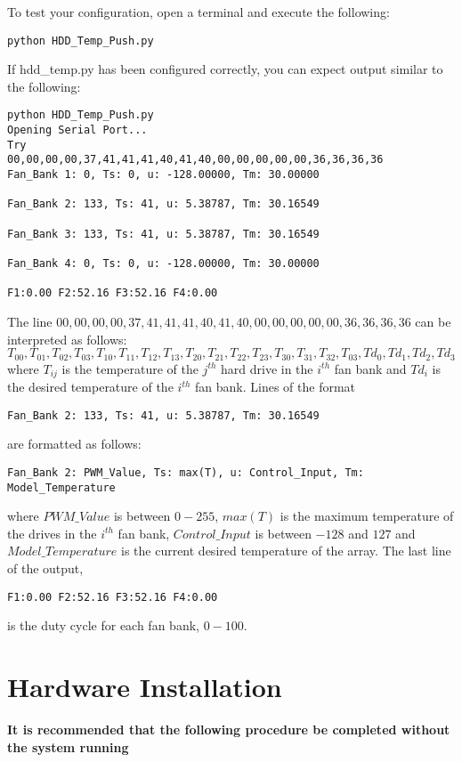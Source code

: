 \documentclass[10pt,letterpaper]{report}
\begin{document}
To test your configuration, open a terminal and execute the following:
%
\begin{verbatim}
python HDD_Temp_Push.py
\end{verbatim}
%
If hdd\_temp.py has been configured correctly, you can expect output similar to the following:
%
\begin{verbatim}
python HDD_Temp_Push.py
Opening Serial Port...
Try
00,00,00,00,37,41,41,41,40,41,40,00,00,00,00,00,36,36,36,36
Fan_Bank 1: 0, Ts: 0, u: -128.00000, Tm: 30.00000

Fan_Bank 2: 133, Ts: 41, u: 5.38787, Tm: 30.16549

Fan_Bank 3: 133, Ts: 41, u: 5.38787, Tm: 30.16549

Fan_Bank 4: 0, Ts: 0, u: -128.00000, Tm: 30.00000

F1:0.00 F2:52.16 F3:52.16 F4:0.00
\end{verbatim}
The line $00,00,00,00,37,41,41,41,40,41,40,00,00,00,00,00,36,36,36,36$ can be interpreted as follows:
%
\begin{equation}
 T_{00},T_{01},T_{02},T_{03},T_{10},T_{11},T_{12},T_{13},T_{20},T_{21},T_{22},T_{23},T_{30},T_{31},T_{32},T_{03},Td_0,Td_1,Td_2,Td_3
\end{equation}
%
where $T_{ij}$ is the temperature of the $j^{th}$ hard drive in the $i^{th}$ fan bank and $Td_i$ is the desired temperature of the $i^{th}$ fan bank. Lines of the format 
\begin{verbatim}
Fan_Bank 2: 133, Ts: 41, u: 5.38787, Tm: 30.16549
\end{verbatim}
are formatted as follows:
\begin{verbatim}
Fan_Bank 2: PWM_Value, Ts: max(T), u: Control_Input, Tm: Model_Temperature
\end{verbatim}
%
where $PWM\_Value$ is between $0-255$, $max(T)$ is the maximum temperature of the drives in the $ i^{th}$ fan bank, $Control\_Input$ is between $-128$ and $127$ and $ Model\_Temperature $ is the current desired temperature of the array.
%
The last line of the output,
\begin{verbatim}
F1:0.00 F2:52.16 F3:52.16 F4:0.00
\end{verbatim}
%
is the duty cycle for each fan bank, $0-100$.

\section{Hardware Installation}

\textbf{It is recommended that the following procedure be completed without the system running}
\end{document}
